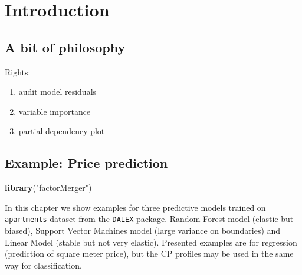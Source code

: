 \documentclass[]{book}
\newenvironment{Shaded}{\begin{snugshade}}{\end{snugshade}}
\newcommand{\KeywordTok}[1]{\textcolor[rgb]{0.13,0.29,0.53}{\textbf{#1}}}
\newcommand{\NormalTok}[1]{#1}
\newcommand{\StringTok}[1]{\textcolor[rgb]{0.31,0.60,0.02}{#1}}
\providecommand{\tightlist}{%
  \setlength{\itemsep}{0pt}\setlength{\parskip}{0pt}}
\theoremstyle{definition}
\theoremstyle{definition}
\theoremstyle{definition}
\theoremstyle{remark}
\begin{document}
\hypertarget{introduction-2}{%
\chapter{Introduction}\label{introduction-2}}

\hypertarget{a-bit-of-philosophy}{%
\section{A bit of philosophy}\label{a-bit-of-philosophy}}

Rights:

\begin{enumerate}
\def\labelenumi{\arabic{enumi}.}
\tightlist
\item
  audit model residuals
\item
  variable importance
\item
  partial dependency plot
\end{enumerate}

\hypertarget{example-price-prediction}{%
\section{Example: Price prediction}\label{example-price-prediction}}

\citep{R-DALEX}

\citep{R-e1071}

\citep{R-factorMerger}

\begin{Shaded}
\begin{Highlighting}[]
\KeywordTok{library}\NormalTok{(}\StringTok{"factorMerger"}\NormalTok{)}
\end{Highlighting}
\end{Shaded}

In this chapter we show examples for three predictive models trained on
\texttt{apartments} dataset from the \texttt{DALEX} package. Random
Forest model (elastic but biased), Support Vector Machines model (large
variance on boundaries) and Linear Model (stable but not very elastic).
Presented examples are for regression (prediction of square meter
price), but the CP profiles may be used in the same way for
classification.
\end{document}
